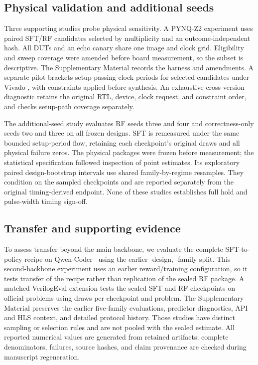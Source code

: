 \subsection{Physical validation and additional seeds}

Three supporting studies probe physical sensitivity. A PYNQ-Z2 experiment
uses paired SFT/RF candidates selected by multiplicity and an outcome-independent
hash. All DUTs and an echo canary share one image and clock grid. Eligibility
and sweep coverage were amended before board measurement, so the subset is
descriptive. The Supplementary Material records the harness and amendments.
A separate pilot brackets setup-passing clock periods for
 selected candidates under Vivado
, with constraints applied before synthesis.
An exhaustive cross-version diagnostic retains the original RTL, device,
clock request, and constraint order, and checks setup-path coverage separately.

The additional-seed study evaluates RF seeds three and four and correctness-only
seeds two and three on all  frozen designs.
SFT is remeasured under the same bounded setup-period flow, retaining each
checkpoint's original draws and all physical failure zeros. The physical
packages were frozen before measurement; the statistical specification followed
inspection of point estimates. Its exploratory paired design-bootstrap
intervals use  shared family-by-regime
resamples. They condition on the sampled checkpoints and are reported separately
from the original timing-derived endpoint. None of these studies establishes
full hold and pulse-width timing sign-off.

\subsection{Transfer and supporting evidence}

To assess transfer beyond the main backbone, we evaluate the complete
SFT-to-policy recipe on
Qwen-Coder~\cite{hui2024qwen25coder} using the
earlier -design, -family split.
This second-backbone experiment uses an earlier reward/training configuration,
so it tests transfer of the recipe rather than replication of the sealed RF
package. A matched VerilogEval extension tests the sealed SFT and RF checkpoints
on  official problems using
 draws per checkpoint and problem. The
Supplementary Material preserves the earlier five-family evaluations,
predictor diagnostics, API and HLS context, and detailed protocol history.
Those studies have distinct sampling or selection rules and are not pooled
with the sealed estimate. All reported numerical values are generated from
retained artifacts; complete denominators, failures, source hashes, and claim
provenance are checked during manuscript regeneration.
